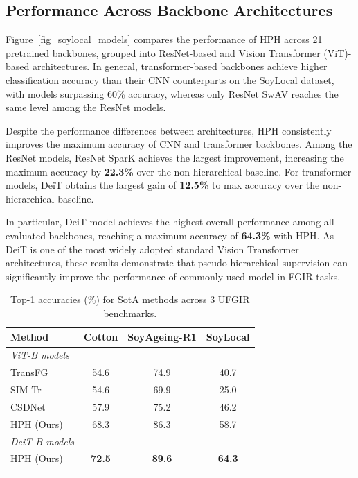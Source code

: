 \documentclass[conference,a4paper]{IEEEtran}
\begin{document}
\subsection{Performance Across Backbone Architectures}
Figure~\ref{fig_soylocal_models} compares the performance of HPH across 21 pretrained backbones, grouped into ResNet-based and Vision Transformer (ViT)-based architectures. In general, transformer-based backbones achieve higher classification accuracy than their CNN counterparts on the SoyLocal dataset, with models surpassing 60\% accuracy, whereas only ResNet SwAV reaches the same level among the ResNet models.

Despite the performance differences between architectures, HPH consistently improves the maximum accuracy of CNN and transformer backbones. Among the ResNet models, ResNet SparK achieves the largest improvement, increasing the maximum accuracy by \textbf{22.3\%} over the non-hierarchical baseline. For transformer models, DeiT obtains the largest gain of \textbf{12.5\%} to max accuracy over the non-hierarchical baseline.

In particular, DeiT model achieves the highest overall performance among all evaluated backbones, reaching a maximum accuracy of \textbf{64.3\%} with HPH. As DeiT is one of the most widely adopted standard Vision Transformer architectures, these results demonstrate that pseudo-hierarchical supervision can significantly improve the performance of commonly used model in FGIR tasks.

\begin{table}[!t]
\centering
\vspace{-2mm}
\caption{Top-1 accuracies (\%) for SotA methods across 3 UFGIR benchmarks.}
\begin{tabular}{lccc}
\toprule
Method & Cotton & SoyAgeing-R1 & SoyLocal \\
\midrule
\textit{ViT-B models} \\
TransFG\cite{he_transfg_2022}   & 54.6 & 74.9 & 40.7 \\
SIM-Tr\cite{sun_sim-trans_2022}    & 54.6 & 69.9 & 25.0 \\
CSDNet\cite{fang_learning_2024}    & 57.9 & 75.2 & 46.2 \\
HPH (Ours) & \underline{68.3} & \underline{86.3} & \underline{58.7} \\
\midrule
\textit{DeiT-B models} \\
HPH (Ours)     & \textbf{72.5} & \textbf{89.6} & \textbf{64.3} \\
\bottomrule
\label{tab_compare_othersoy}
\vspace{-5.5mm}
\end{tabular}
\end{table}
\end{document}
